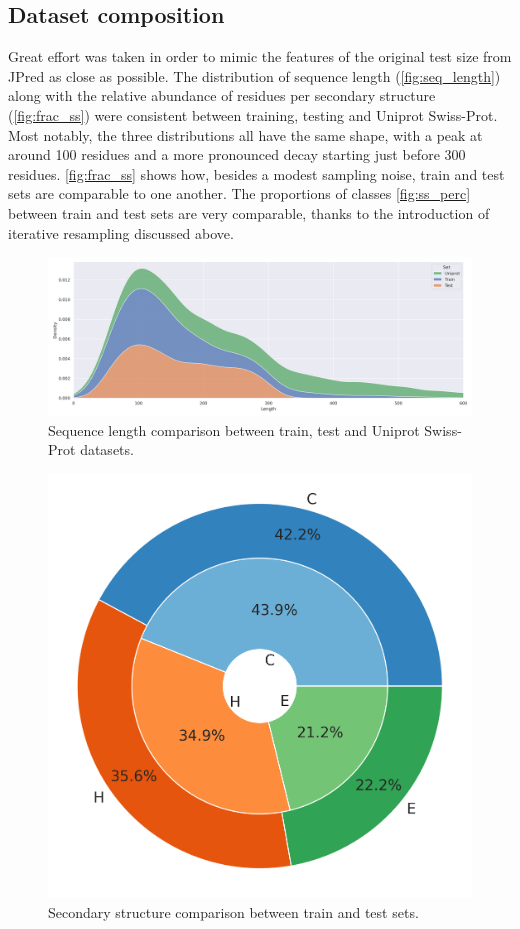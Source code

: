 \documentclass[nocrop]{bioinfo}
\begin{document}
\subsection*{Dataset composition}
Great effort was taken in order to mimic the features of the original test size from JPred as close as possible.
The distribution of sequence length (\autoref{fig:seq_length}) along with the relative abundance of residues per secondary structure (\autoref{fig:frac_ss}) were consistent between training, testing and Uniprot Swiss-Prot.
Most notably, the three distributions all have the same shape, with a peak at around 100 residues and a more pronounced decay starting just before 300 residues.
\autoref{fig:frac_ss} shows how, besides a modest sampling noise, train and test sets are comparable to one another.
The proportions of classes \autoref{fig:ss_perc} between train and test sets are very comparable, thanks to the introduction of iterative resampling discussed above.

\begin{figure}[!tb]
	\includegraphics[width=\textwidth]{sequence_length.png}
	\caption{Sequence length comparison between train, test and Uniprot Swiss-Prot datasets.}\label{fig:seq_length}
\end{figure}
\begin{figure}[!tb]
	\includegraphics[width=\columnwidth]{secondary.png}
	\caption{Secondary structure comparison between train and test sets.}\label{fig:ss_perc}
\end{figure}
\end{document}
